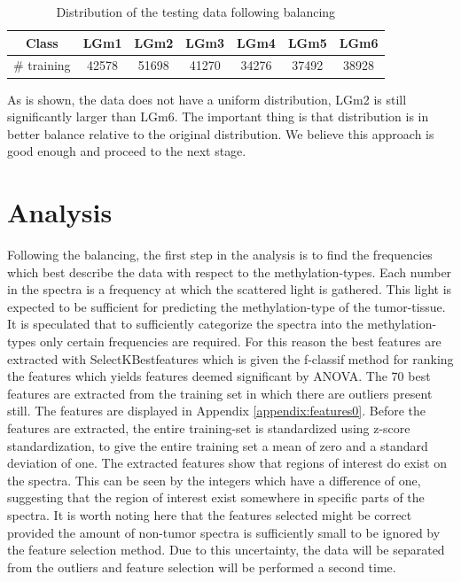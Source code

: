 \begin{table}[htb]
\centering
 \begin{tabular}{||c c c c c c c||} 
 \hline
 Class & LGm1 & LGm2 & LGm3 & LGm4 & LGm5 & LGm6 \\ [0.5ex] 
 \hline\hline
 \# training & 42578 & 51698 & 41270 & 34276 & 37492 & 38928 \\
 \hline 

\end{tabular}
\caption{Distribution of the testing data following balancing}
\label{table:3}
\end{table}

As is shown, the data does not have a uniform distribution, LGm2 is still significantly larger than LGm6. The important thing is that distribution is in better balance relative to the original distribution. We believe this approach is good enough and proceed to the next stage.


\section{Analysis}

Following the balancing, the first step in the analysis is to find the frequencies which best describe the data with respect to the methylation-types. Each number in the spectra is a frequency at which the scattered light is gathered. This light is expected to be sufficient for predicting the methylation-type of the tumor-tissue. It is speculated that to sufficiently categorize the spectra into the methylation-types only certain frequencies are required. For this reason the best features are extracted with SelectKBestfeatures \cite{scikit} which is given the f-classif method for ranking the features which yields features deemed significant by ANOVA. The 70 best features are extracted from the training set in which there are outliers present still. The features are displayed in Appendix \ref{appendix:features0}. Before the features are extracted, the entire training-set is standardized using z-score standardization, to give the entire training set a mean of zero and a standard deviation of one. The extracted features show that regions of interest do exist on the spectra. This can be seen by the integers which have a difference of one, suggesting that the region of interest exist somewhere in specific parts of the spectra. It is worth noting here that the features selected might be correct provided the amount of non-tumor spectra is sufficiently small to be ignored by the feature selection method. Due to this uncertainty, the data will be separated from the outliers and feature selection will be performed a second time.

